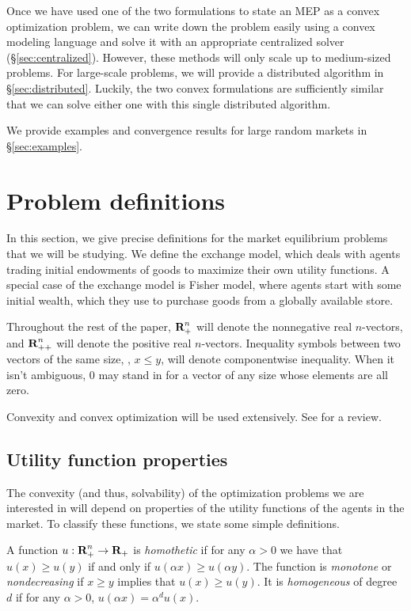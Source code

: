 \documentclass[12pt]{article}
\begin{document}
Once we have used one of the two formulations to state an MEP as a convex
optimization problem, we can write down the problem easily using a convex
modeling language and solve it with an appropriate centralized solver
(\S\ref{sec:centralized}). However, these methods will only scale up to
medium-sized problems. For large-scale problems, we will provide a distributed
algorithm in \S\ref{sec:distributed}. Luckily, the two convex formulations are
sufficiently similar that we can solve either one with this single distributed
algorithm.

We provide examples and convergence results for large random markets in
\S\ref{sec:examples}.


\section{Problem definitions}
\label{sec:defs}

In this section, we give precise definitions for the market equilibrium
problems that we will be studying. We define the exchange model, which deals
with agents trading initial endowments of goods to maximize their own utility
functions. A special case of the exchange model is Fisher model, where agents
start with some initial wealth, which they use to purchase goods  from a
globally available store.

Throughout the rest of the paper, ${\mbox{\bf R}}^n_+$ will denote the nonnegative
real $n$-vectors, and ${\mbox{\bf R}}^n_{++}$ will denote the positive real $n$-vectors.
Inequality symbols between two vectors of the same size, \eg, $x \leq y$,
will denote componentwise inequality. When it isn't ambiguous, $0$ may stand
in for a vector of any size whose elements are all zero.

Convexity and convex optimization will be used extensively. See \cite{BoV:04}
for a review.

\subsection{Utility function properties}

The convexity (and thus, solvability) of the optimization problems we are
interested in will depend on properties of the utility functions of the agents
in the market. To classify these functions, we state some simple definitions.

A function $u: {\mbox{\bf R}}^n_+ \to {\mbox{\bf R}}_+$ is \emph{homothetic} if for any $\alpha
> 0$ we have that $u(x) \geq u(y)$ if and only if $u(\alpha x) \geq u(\alpha
y)$. The function is \emph{monotone} or \emph{nondecreasing} if $x \geq y$
implies that $u(x) \geq u(y)$. It is \emph{homogeneous} of degree $d$ if for
any $\alpha > 0$, $u(\alpha x) = \alpha^d u(x)$.
\end{document}
